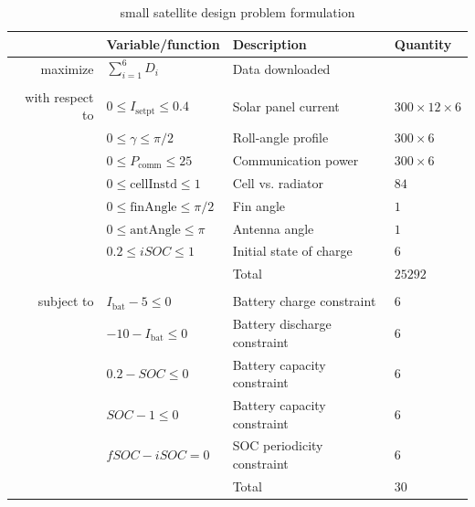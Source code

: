 \documentclass[]{aiaa-tc} %
\begin{document}
    \begin{table}
        \centering
        \begin{tabular}{r l l l}
            \hline
            & Variable/function & Description & Quantity \\
            \hline
            maximize            & $\sum_{i=1}^6 D_i$ & Data downloaded \\
            \\
            with respect to & $0 \le I_\text{setpt} \le 0.4$ & Solar panel current & $300 \times 12 \times 6$ \\
                                    & $0 \le \gamma \le \pi / 2$ & Roll-angle profile & $300 \times 6$ \\
                                    & $0 \le P_\text{comm} \le 25$ & Communication power & $300 \times 6$ \\
                                    & $0 \le \text{cellInstd} \le 1$ & Cell vs. radiator & $84$ \\
                                    & $0 \le \text{finAngle} \le \pi / 2$ & Fin angle & $1$ \\
                                    & $0 \le \text{antAngle} \le \pi$ & Antenna angle & $1$ \\
                                    & $0.2 \le iSOC \le 1$ & Initial state of charge & $6$ \\
                                    & & Total & $25292$ \\
            \\
            subject to          & $I_\text{bat} - 5 \le 0$ & Battery charge constraint & $6$ \\
                                    & $-10 - I_\text{bat} \le 0$ & Battery discharge constraint & $6$ \\
                                    & $0.2 - SOC \le 0$ & Battery capacity constraint & $6$ \\
                                    & $SOC - 1 \le 0$ & Battery capacity constraint & $6$ \\
                                    & $fSOC - iSOC = 0$ & SOC periodicity constraint & $6$ \\
                                    & & Total & $30$ \\
            \hline
        \end{tabular}
        \caption{small satellite design problem formulation}
        \label{eqn:cadre_formulation}
    \end{table}
\end{document}
